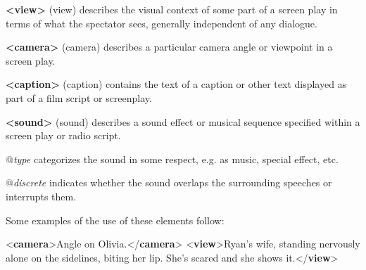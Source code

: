 \begin{sansreflist}
  
\item [\textbf{<view>}] (view) describes the visual context of some part of a screen play in terms of what the spectator sees, generally independent of any dialogue.
\item [\textbf{<camera>}] (camera) describes a particular camera angle or viewpoint in a screen play.
\item [\textbf{<caption>}] (caption) contains the text of a caption or other text displayed as part of a film script or screenplay.
\item [\textbf{<sound>}] (sound) describes a sound effect or musical sequence specified within a screen play or radio script.\hfil\\[-10pt]\begin{sansreflist}
    \item[@{\itshape type}]
  categorizes the sound in some respect, e.g. as music, special effect, etc.
    \item[@{\itshape discrete}]
  indicates whether the sound overlaps the surrounding speeches or interrupts them.
\end{sansreflist}  
\end{sansreflist}
\par
Some examples of the use of these elements follow: \par\bgroup{}\exampleFont \begin{shaded}\noindent\mbox{}{<\textbf{camera}>}Angle on Olivia.{</\textbf{camera}>}\mbox{}\newline 
{<\textbf{view}>}Ryan's wife, standing nervously alone on the sidelines,\mbox{}\newline 
 biting her lip. She's scared and she shows it.{</\textbf{view}>}\end{shaded}\egroup\par \par
